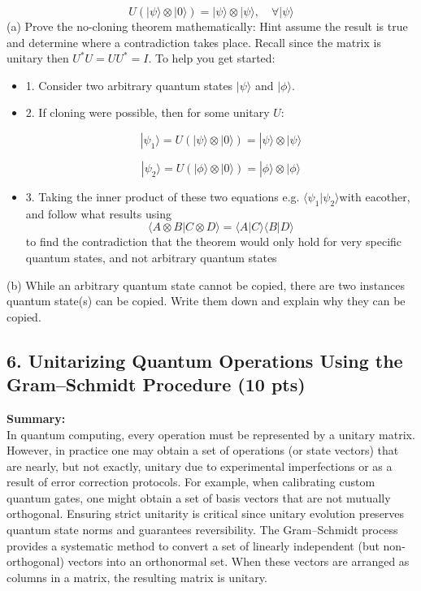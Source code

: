 \documentclass[12pt]{article}
\newcommand{\ket}[1]{| #1 \rangle}
\begin{document}
\[
U (|\psi\rangle \otimes |0\rangle) = |\psi\rangle \otimes |\psi\rangle, \quad \forall |\psi\rangle
\]
(a) Prove the no-cloning theorem mathematically: Hint assume the result is true and determine where a contradiction takes place. Recall since the matrix is unitary then $ U^*U=UU^*=I$. To help you get started:
\begin{itemize}
    \item 1. Consider two arbitrary quantum states \( |\psi\rangle \) and \( |\phi\rangle \).
\item 2. If cloning were possible, then for some unitary \( U \):

   \[
   \ket{\psi_1}= U(|\psi\rangle \otimes |0\rangle) = |\psi\rangle \otimes |\psi\rangle
   \]

   \[
   \ket{\psi_2} =U(|\phi\rangle \otimes |0\rangle) = |\phi\rangle \otimes |\phi\rangle
   \]

\item 3. Taking the inner product of these two equations e.g. $\langle \psi_1 | \psi_2 \rangle $with eacother, and follow what results using \[
\langle A \otimes B | C \otimes D \rangle = \langle A | C \rangle \langle B | D \rangle
\] to find the contradiction that the theorem would only hold for very specific quantum states, and not arbitrary quantum states
\end{itemize}

(b) While an arbitrary quantum state cannot be copied, there are two instances quantum state(s) can be copied. Write them down and explain why they can be copied.

\subsection*{6. Unitarizing Quantum Operations Using the Gram--Schmidt Procedure (10 pts)}

\textbf{Summary:}\\
In quantum computing, every operation must be represented by a unitary matrix. However, in practice one may obtain a set of operations (or state vectors) that are nearly, but not exactly, unitary due to experimental imperfections or as a result of error correction protocols. For example, when calibrating custom quantum gates, one might obtain a set of basis vectors that are not mutually orthogonal. Ensuring strict unitarity is critical since unitary evolution preserves quantum state norms and guarantees reversibility. The Gram--Schmidt process provides a systematic method to convert a set of linearly independent (but non-orthogonal) vectors into an orthonormal set. When these vectors are arranged as columns in a matrix, the resulting matrix is unitary.
\end{document}
